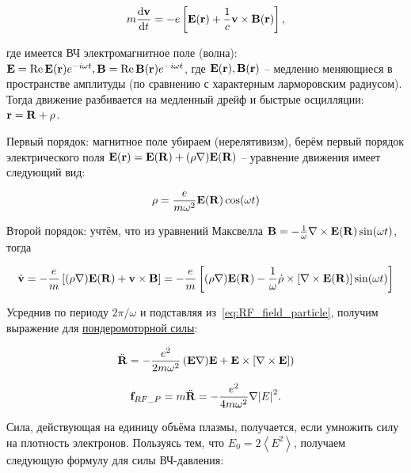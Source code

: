 \documentclass[10pt, a4paper]{article}
\begin{document}
\begin{equation*}
	m\dv{\vb{v}}{t}=-e\left[\vb{E}(\vb{r})+\frac{1}{c}\vb{v}\times\vb{B}(\vb{r})\right],
\end{equation*}

где имеется ВЧ электромагнитное поле (волна): $\vb{E}=\Re\vb{E}(\vb{r})e^{-i\omega t}, \vb{B}=\Re\vb{B}(\vb{r})e^{-i\omega t}$, где $\vb{E}(\vb{r}), \vb{B}(\vb{r})$ -- медленно меняющиеся в пространстве амплитуды (по сравнению с характерным ларморовским радиусом). Тогда движение разбивается на медленный дрейф и быстрые осцилляции: $\vb{r}=\vb{R}+\vb{\rho}$. 

Первый порядок: магнитное поле убираем (нерелятивизм), берём первый порядок электрического поля $\vb{E}(\vb{r})=\vb{E}(\vb{R}) + (\vb{\rho}\nabla)\vb{E}(\vb{R})$ -- уравнение движения имеет следующий вид:

\begin{equation}
    \label{eq:RF_field_particle}
    \vb{\rho} = \frac{e}{m\omega^2} \vb{E}(\vb{R}) \cos(\omega t)
\end{equation}

Второй порядок: учтём, что из уравнений Максвелла $\vb{B} = -\frac{1}{\omega}\nabla\times\vb{E}(\vb{R})\sin(\omega t)$, тогда 

\begin{equation*}
	\dot{\vb{v}} = -\frac{e}{m} \left[(\vb{\rho}\nabla)\vb{E}(\vb{R}) + \vb{v}\times\vb{B}\right] = -\frac{e}{m}\left[ (\vb{\rho}\nabla)\vb{E}(\vb{R})-\frac{1}{\omega}\dot{\vb{\rho}}\times\left[ \nabla\times\vb{E}(\vb{R})\right] \sin(\omega t)\right]
\end{equation*}

Усреднив по периоду $2\pi/\omega$ и подставляя из~\eqref{eq:RF_field_particle}, получим выражение для \uline{пондеромоторной силы}:

\begin{equation*}
	\ddot{\vb{R}} = -\frac{e^2}{2m\omega^2}\left(\vb{E}\nabla)\vb{E} +\vb{E}\times\left[\nabla\times\vb{E}\right]\right)
\end{equation*}

\begin{equation}
    \vb{f}_{RF\_P}=m\ddot{\vb{R}}=-\frac{e^2}{4 m \omega^2} \nabla \abs{E}^2.
\end{equation}

Сила, действующая на единицу объёма плазмы,
получается, если умножить силу на	 плотность электронов. Пользуясь тем, что $E_0 = 2\left\langle E^2 \right\rangle $,
получаем следующую формулу для силы ВЧ-давления:
\end{document}
